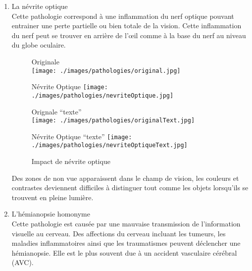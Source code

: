 \documentclass[french,a4paper]{report}
\begin{document}
{\begin{enumerate}
(en dessous de $4/10^{ème}$) \newline
\item La névrite optique
\\Cette pathologie correspond à une inflammation du nerf optique pouvant entrainer une perte partielle ou bien totale de la vision. Cette inflammation du nerf peut se trouver en arrière de l'œil comme à la base du nerf au niveau du globe oculaire.\\
\begin{figure}[H]
\begin{minipage}{0.5\textwidth}
\centering
Originale \\ \vspace{0.2cm}
\texttt{[image: ./images/pathologies/original.jpg]}
\end{minipage}
\begin{minipage}{0.5\textwidth}
\centering
Névrite Optique\vspace{0.2cm}
\texttt{[image: ./images/pathologies/nevriteOptique.jpg]}
\end{minipage}
\begin{minipage}{0.5\textwidth}
\centering
\vspace{0.4cm}Orignale \enquote{texte}\\
\texttt{[image: ./images/pathologies/originalText.jpg]}
\end{minipage}
\begin{minipage}{0.5\textwidth}
\centering
\vspace{0.4cm}Névrite Optique \enquote{texte}\vspace{0.1cm}
\texttt{[image: ./images/pathologies/nevriteOptiqueText.jpg]}
\end{minipage}
\caption{Impact de névrite optique}
\end{figure}
Des zones de non vue apparaissent dans le champ de vision, les couleurs et contrastes deviennent difficiles à distinguer tout comme les objets lorsqu'ils se trouvent en pleine lumière.
\newline
\item L'hémianopsie homonyme
\\Cette pathologie est causée par une mauvaise transmission de l'information visuelle au cerveau. Des affections du cerveau incluant les tumeurs, les maladies inflammatoires ainsi que les traumatismes peuvent déclencher une hémianopsie. Elle est le plus souvent due à un accident vasculaire cérébral (AVC).\\
\begin{figure}[H]

\end{figure}
\end{enumerate}}
\end{document}
